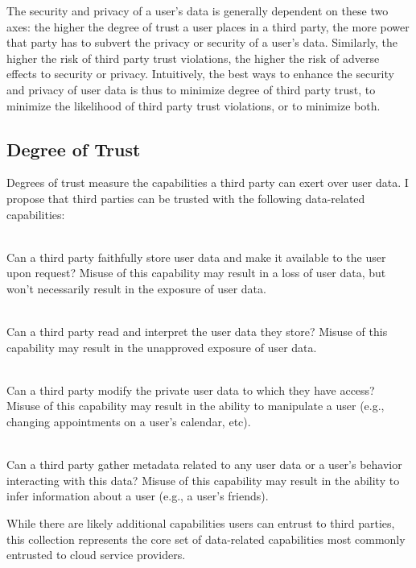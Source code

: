 The security and privacy of a user's data is generally dependent on
these two axes: the higher the degree of trust a user places in a
third party, the more power that party has to subvert the privacy or
security of a user's data. Similarly, the higher the risk of third
party trust violations, the higher the risk of adverse effects to
security or privacy.  Intuitively, the best ways to enhance the
security and privacy of user data is thus to minimize degree of third
party trust, to minimize the likelihood of third party trust
violations, or to minimize both.

\subsection{Degree of Trust}

Degrees of trust measure the capabilities a third party can exert over
user data. I propose that third parties can be trusted with the
following data-related capabilities:

\begin{packed_desc}
\item[Storage (S-Capability):] \hfill \\ Can a third party faithfully
  store user data and make it available to the user upon request?
  Misuse of this capability may result in a loss of user data, but
  won't necessarily result in the exposure of user data.
\item[Access (R-Capability):] \hfill \\ Can a third party read and
  interpret the user data they store? Misuse of this capability may
  result in the unapproved exposure of user data.
\item[Manipulation (W-Capability):] \hfill \\ Can a third party modify
  the private user data to which they have access? Misuse of this
  capability may result in the ability to manipulate a user
  (e.g., changing appointments on a user's calendar, etc).
\item[Meta-analysis (M-Capability):] \hfill \\ Can a third party
  gather metadata related to any user data or a user's behavior
  interacting with this data? Misuse of this capability may result in
  the ability to infer information about a user (e.g., a user's
  friends).
\end{packed_desc}

While there are likely additional capabilities users can entrust to
third parties, this collection represents the core set of data-related
capabilities most commonly entrusted to cloud service providers.

